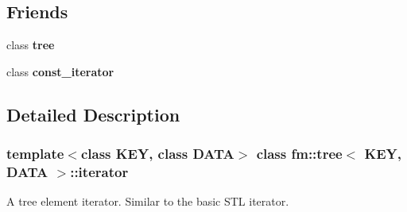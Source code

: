 \subsection*{Friends}
\begin{DoxyCompactItemize}
\item 
\hypertarget{classfm_1_1tree_1_1iterator_a274b977404a53ceb91af64dfd96c9641}{
class {\bfseries tree}}
\label{classfm_1_1tree_1_1iterator_a274b977404a53ceb91af64dfd96c9641}

\item 
\hypertarget{classfm_1_1tree_1_1iterator_ac220ce1c155db1ac44146c12d178056f}{
class {\bfseries const\_\-iterator}}
\label{classfm_1_1tree_1_1iterator_ac220ce1c155db1ac44146c12d178056f}

\end{DoxyCompactItemize}


\subsection{Detailed Description}
\subsubsection*{template$<$class KEY, class DATA$>$ class fm::tree$<$ KEY, DATA $>$::iterator}

A tree element iterator. Similar to the basic STL iterator. 


